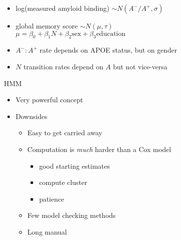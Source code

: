 \begin{frame}
  \begin{itemize}
    \item log(measured amyloid binding) $ \sim N(A^-/A^+, \sigma)$
    \item global memory score $\sim N(\mu, \tau)$ \\
      $\mu = \beta_0 + \beta_1N + \beta_2\mbox{sex} + \beta_3\mbox{education}$
    \item $A^-:A^+$ rate depends on APOE status, but on gender
    \item $N$ transition rates depend on $A$ but not vice-versa
  \end{itemize}
\end{frame}

\begin{frame}{HMM}
  \begin{itemize}
    \item Very powerful concept
    \item Downsides
      \begin{itemize}
        \item Easy to get carried away
        \item Computation is \emph{much} harder than a Cox model
          \begin{itemize}
            \item good starting estimates
            \item compute cluster
            \item patience
          \end{itemize}
        \item Few model checking methods
        \item Long manual
      \end{itemize}
  \end{itemize}
\end{frame}
  
\begin{frame}
\end{frame}

\begin{frame}
\end{frame}

\begin{frame}
\end{frame}

\begin{frame}
\end{frame}

